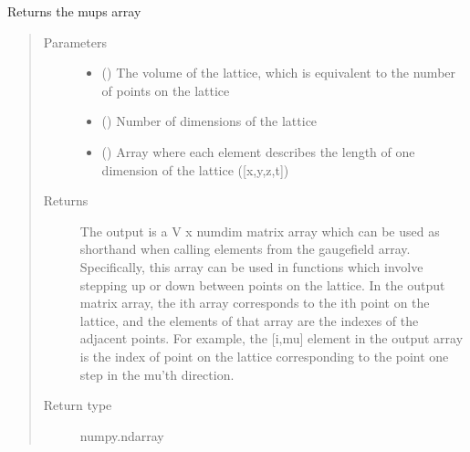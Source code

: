 \documentclass[letterpaper,10pt,english]{sphinxmanual}
\begin{document}
\begin{fulllineitems}
\label{\detokenize{index:su2.getMups}}
Returns the mups array
\begin{quote}\begin{description}
\item[{Parameters}] \leavevmode\begin{itemize}
\item {} 
 () \textendash{} The volume of the lattice, which is equivalent to the number of
points on the lattice

\item {} 
 () \textendash{} Number of dimensions of the lattice

\item {} 
 () \textendash{} Array where each element describes the length of one
dimension of the lattice ({[}x,y,z,t{]})

\end{itemize}

\item[{Returns}] \leavevmode
The output is a V x numdim matrix array which can be used as
shorthand when calling elements from the gaugefield array.
Specifically, this array can be used in functions which
involve stepping up or down between points on the lattice.
In the output matrix array, the ith array corresponds to the
ith point on the lattice, and the elements of that array are
the indexes of the adjacent points. For example, the {[}i,mu{]}
element in the output array is the index of point on the
lattice corresponding to the point one step in the mu’th
direction.

\item[{Return type}] \leavevmode
numpy.ndarray

\end{description}\end{quote}

\end{fulllineitems}

\end{document}
